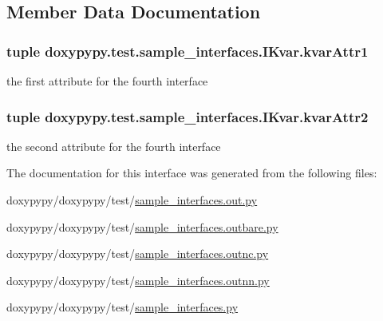 \subsection{Member Data Documentation}
\hypertarget{classdoxypypy_1_1test_1_1sample__interfaces_1_1_i_kvar_aa15c60da40816aa3d268c4b13c21ee17}{
\subsubsection[{kvar\-Attr1}]{\setlength{\rightskip}{0pt plus 5cm}tuple doxypypy.\-test.\-sample\-\_\-interfaces.\-I\-Kvar.\-kvar\-Attr1\hspace{0.3cm}{\ttfamily [static]}}}\label{classdoxypypy_1_1test_1_1sample__interfaces_1_1_i_kvar_aa15c60da40816aa3d268c4b13c21ee17}


the first attribute for the fourth interface 

\hypertarget{classdoxypypy_1_1test_1_1sample__interfaces_1_1_i_kvar_a2fac6d5b7b1c1e792febd39470470bc0}{
\subsubsection[{kvar\-Attr2}]{\setlength{\rightskip}{0pt plus 5cm}tuple doxypypy.\-test.\-sample\-\_\-interfaces.\-I\-Kvar.\-kvar\-Attr2\hspace{0.3cm}{\ttfamily [static]}}}\label{classdoxypypy_1_1test_1_1sample__interfaces_1_1_i_kvar_a2fac6d5b7b1c1e792febd39470470bc0}


the second attribute for the fourth interface 



The documentation for this interface was generated from the following files\-:\begin{DoxyCompactItemize}
\item 
doxypypy/doxypypy/test/\hyperlink{sample__interfaces_8out_8py}{sample\-\_\-interfaces.\-out.\-py}\item 
doxypypy/doxypypy/test/\hyperlink{sample__interfaces_8outbare_8py}{sample\-\_\-interfaces.\-outbare.\-py}\item 
doxypypy/doxypypy/test/\hyperlink{sample__interfaces_8outnc_8py}{sample\-\_\-interfaces.\-outnc.\-py}\item 
doxypypy/doxypypy/test/\hyperlink{sample__interfaces_8outnn_8py}{sample\-\_\-interfaces.\-outnn.\-py}\item 
doxypypy/doxypypy/test/\hyperlink{sample__interfaces_8py}{sample\-\_\-interfaces.\-py}\end{DoxyCompactItemize}
